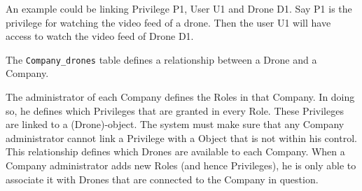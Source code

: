 An example could be linking Privilege P1, User U1 and Drone D1.
Say P1 is the privilege for watching the video feed of a drone.
Then the user U1 will have access to watch the video feed of Drone D1.


The \verb+Company_drones+ table defines a relationship between a Drone and a Company.

The administrator of each Company defines the Roles in that Company.
In doing so, he defines which Privileges that are granted in every Role.
These Privileges are linked to a (Drone)-object.
The system must make sure that any Company administrator cannot link a Privilege with a Object that is not within his control. \\

This relationship defines which Drones are available to each Company.
When a Company administrator adds new Roles (and hence Privileges), he is only able to associate it with Drones that are connected to the Company in question.
